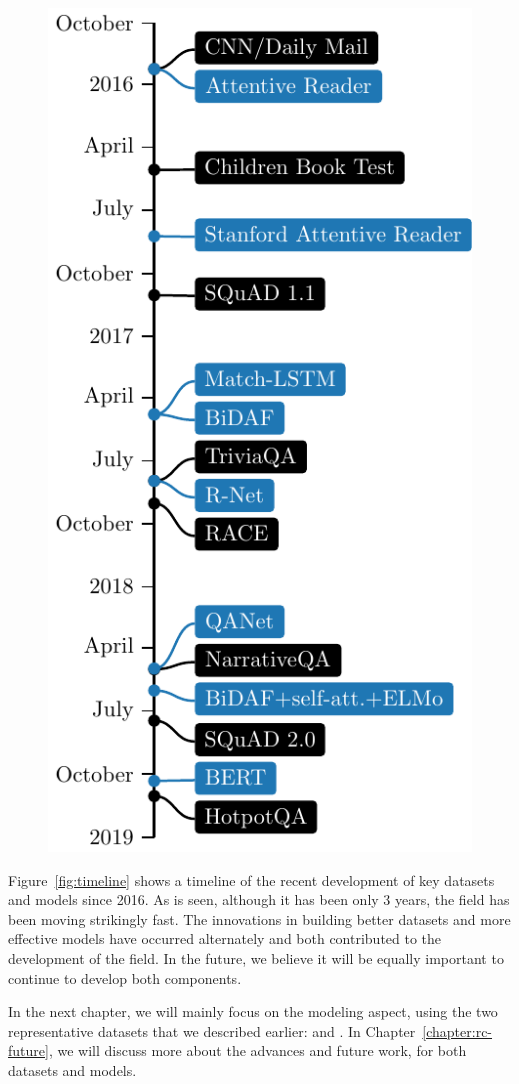 \begin{figure}[!t]
    \center
    \includegraphics[scale=1.0]{img/timeline.pdf}
\end{figure}

Figure~\ref{fig:timeline} shows a timeline of the recent development of key datasets and models since 2016. As is seen, although it has been only 3 years, the field has been moving strikingly fast. The innovations in building better datasets and more effective models have occurred alternately and both contributed to the development of the field. In the future, we believe it will be equally important to continue to develop both components.

In the next chapter, we will mainly focus on the modeling aspect, using the two representative datasets that we described earlier:  and . In Chapter~\ref{chapter:rc-future}, we will discuss more about the advances and future work, for both datasets and models.
